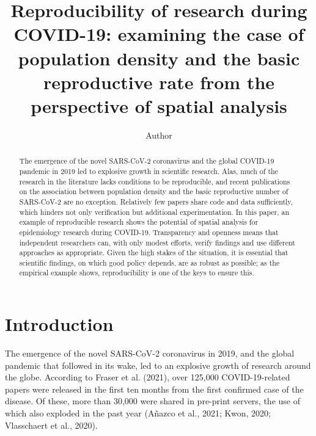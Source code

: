 \documentclass[]{elsarticle} %
\begin{document}
\begin{frontmatter}

  \title{Reproducibility of research during COVID-19: examining the case
of population density and the basic reproductive rate from the
perspective of spatial analysis}
    \author[University]{Author}
      \address[University]{Department, Street, City, State ZIP}
  
  \begin{abstract}
  The emergence of the novel SARS-CoV-2 coronavirus and the global
  COVID-19 pandemic in 2019 led to explosive growth in scientific
  research. Alas, much of the research in the literature lacks
  conditions to be reproducible, and recent publications on the
  association between population density and the basic reproductive
  number of SARS-CoV-2 are no exception. Relatively few papers share
  code and data sufficiently, which hinders not only verification but
  additional experimentation. In this paper, an example of reproducible
  research shows the potential of spatial analysis for epidemiology
  research during COVID-19. Transparency and openness means that
  independent researchers can, with only modest efforts, verify findings
  and use different approaches as appropriate. Given the high stakes of
  the situation, it is essential that scientific findings, on which good
  policy depends, are as robust as possible; as the empirical example
  shows, reproducibility is one of the keys to ensure this.
  \end{abstract}
  
 \end{frontmatter}

\newpage

\hypertarget{introduction}{%
\section{Introduction}\label{introduction}}

The emergence of the novel SARS-CoV-2 coronavirus in 2019, and the
global pandemic that followed in its wake, led to an explosive growth of
research around the globe. According to Fraser et al. (2021), over
125,000 COVID-19-related papers were released in the first ten months
from the first confirmed case of the disease. Of these, more than 30,000
were shared in pre-print servers, the use of which also exploded in the
past year (Añazco et al., 2021; Kwon, 2020; Vlasschaert et al., 2020).
\end{document}

